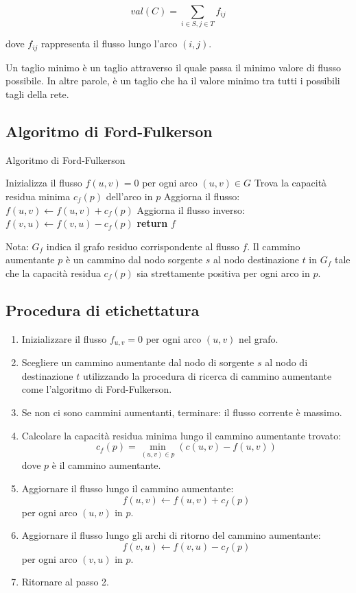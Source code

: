 $$
val(C) = \sum_{i\in S, j\in T} f_{ij}
$$

dove $f_{ij}$ rappresenta il flusso lungo l'arco $(i,j)$.

Un taglio minimo è un taglio attraverso il quale passa il minimo valore di flusso possibile. In altre parole, è un taglio che ha il valore minimo tra tutti i possibili tagli della rete.

\subsection{Algoritmo di Ford-Fulkerson}

\begin{algorithm}[H]
\caption{Algoritmo di Ford-Fulkerson}
\begin{algorithmic}[1]
\State Inizializza il flusso $f(u, v) = 0$ per ogni arco $(u,v)\in G$
    \State Trova la capacità residua minima $c_f(p)$ dell'arco in $p$
        \State Aggiorna il flusso: $f(u,v) \gets f(u,v) + c_f(p)$
        \State Aggiorna il flusso inverso: $f(v,u) \gets f(v,u) - c_f(p)$
    \EndFor
\EndWhile
\State \textbf{return} $f$
\EndProcedure
\end{algorithmic}
\end{algorithm}

Nota: $G_f$ indica il grafo residuo corrispondente al flusso $f$. Il cammino aumentante $p$ è un cammino dal nodo sorgente $s$ al nodo destinazione $t$ in $G_f$ tale che la capacità residua $c_f(p)$ sia strettamente positiva per ogni arco in $p$.

\subsection{Procedura di etichettatura}

\begin{enumerate}
  \item Inizializzare il flusso $f_{u,v} = 0$ per ogni arco $(u,v)$ nel grafo.
  \item Scegliere un cammino aumentante dal nodo di sorgente $s$ al nodo di destinazione $t$ utilizzando la procedura di ricerca di cammino aumentante come l'algoritmo di Ford-Fulkerson.
  \item Se non ci sono cammini aumentanti, terminare: il flusso corrente è massimo.
  \item Calcolare la capacità residua minima lungo il cammino aumentante trovato: 
  $$c_f(p) = \min_{(u,v) \in p} (c(u,v) - f(u,v))$$
  dove $p$ è il cammino aumentante.
  \item Aggiornare il flusso lungo il cammino aumentante: 
  $$f(u,v) \leftarrow f(u,v) + c_f(p)$$ per ogni arco $(u,v)$ in $p$.
  \item Aggiornare il flusso lungo gli archi di ritorno del cammino aumentante: 
  $$f(v,u) \leftarrow f(v,u) - c_f(p)$$ per ogni arco $(v,u)$ in $p$.
  \item Ritornare al passo 2.
\end{enumerate}
